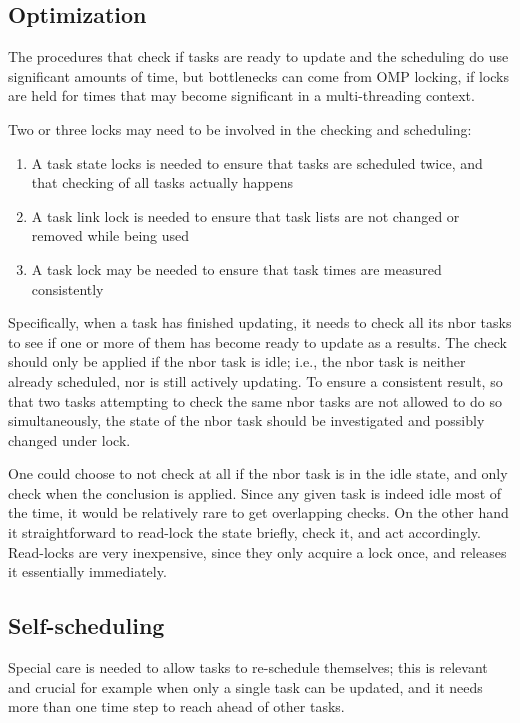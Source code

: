 \documentclass[paper=a4,fontsize=11pt]{scrartcl}
\numberwithin{equation}{section}		%
\numberwithin{figure}{section}			%
\numberwithin{table}{section}				%
\begin{document}
\subsection{Optimization}
The procedures that check if tasks are ready to update and the scheduling do use significant amounts of time, but bottlenecks can come from OMP locking, if locks are held for times that may become significant in a multi-threading context.

Two or three locks may need to be involved in the checking and scheduling: 
\begin{enumerate}
    \item A task state locks is needed to ensure that tasks are scheduled twice, and that checking of all tasks actually happens
    \item A task link lock is needed to ensure that task lists are not changed or removed while being used
    \item A task lock may be needed to ensure that task times are measured consistently
\end{enumerate}
Specifically, when a task has finished updating, it needs to check all its nbor tasks to see if one or more of them has become ready to update as a results.  The check should only be applied if the nbor task is idle; i.e., the nbor task is neither already scheduled, nor is still actively updating.  To ensure a consistent result, so that two tasks attempting to check the same nbor tasks are not allowed to do so simultaneously, the state of the nbor task should be investigated and possibly changed under lock.

One could choose to not check at all if the nbor task is in the idle state, and only check when the conclusion is applied.  Since any given task is indeed idle most of the time, it would be relatively rare to get overlapping checks.  On the other hand it straightforward to read-lock the state briefly, check it, and act accordingly.  Read-locks are very inexpensive, since they only acquire a lock once, and releases it essentially immediately.

\subsection{Self-scheduling}    
Special care is needed to allow tasks to re-schedule themselves; this is relevant and crucial for example when only a single task can be updated, and it needs more than one time step to reach ahead of other tasks.
\end{document}
